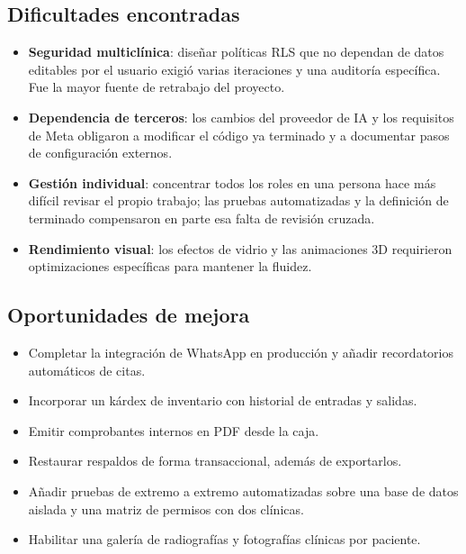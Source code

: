 \documentclass[11pt]{article}
\begin{document}
\subsection{Dificultades encontradas}

\begin{itemize}
  \item \textbf{Seguridad multiclínica}: diseñar políticas RLS que no dependan de datos editables por el usuario exigió varias iteraciones y una auditoría específica. Fue la mayor fuente de retrabajo del proyecto.
  \item \textbf{Dependencia de terceros}: los cambios del proveedor de IA y los requisitos de Meta obligaron a modificar el código ya terminado y a documentar pasos de configuración externos.
  \item \textbf{Gestión individual}: concentrar todos los roles en una persona hace más difícil revisar el propio trabajo; las pruebas automatizadas y la definición de terminado compensaron en parte esa falta de revisión cruzada.
  \item \textbf{Rendimiento visual}: los efectos de vidrio y las animaciones 3D requirieron optimizaciones específicas para mantener la fluidez.
\end{itemize}

\subsection{Oportunidades de mejora}

\begin{itemize}
  \item Completar la integración de WhatsApp en producción y añadir recordatorios automáticos de citas.
  \item Incorporar un kárdex de inventario con historial de entradas y salidas.
  \item Emitir comprobantes internos en PDF desde la caja.
  \item Restaurar respaldos de forma transaccional, además de exportarlos.
  \item Añadir pruebas de extremo a extremo automatizadas sobre una base de datos aislada y una matriz de permisos con dos clínicas.
  \item Habilitar una galería de radiografías y fotografías clínicas por paciente.
\end{itemize}

\clearpage
\printbibliography[heading=bibintoc,title={Referencias}]
\end{document}
